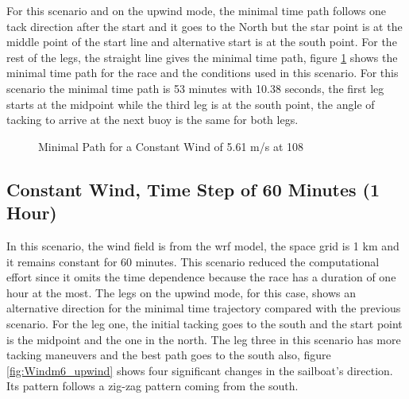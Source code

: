 For this scenario and on the upwind mode, the minimal time path follows one tack direction after the start and it goes to the North but the star point is at the middle point of the start line and alternative start is at the south point. For the rest of the legs, the straight line gives the minimal time path, figure \ref{fig:mtp_constWind} shows the minimal time path for the race and the conditions used in this scenario. For this scenario the minimal time path is 53 minutes with 10.38 seconds, the first leg starts at the midpoint while the third leg is at the south point, the angle of tacking to arrive at the next buoy is the same for both legs. \par  

\begin{figure} [hbt!]
  \centering
   \label{fig:windConst_times}
  \hfill
  \caption{Minimal Path for a Constant Wind of 5.61 m/s at 108 \degree} %
\label{fig:mtp_constWind}
\end{figure}


\subsection{Constant Wind, Time Step of 60 Minutes (1 Hour)}

In this scenario, the wind field is from the \acrshort{wrf} model, the space grid is 1 km and it remains constant for 60 minutes. This scenario reduced the computational effort since it omits the time dependence because the race has a duration of one hour at the most. The legs on the upwind mode, for this case, shows an alternative direction for the minimal time trajectory compared with the previous scenario. For the leg one, the initial tacking goes to the south and the start point is the midpoint and the one in the north. The leg three in this scenario has more tacking maneuvers and the best path goes to the south also, figure \ref{fig:Windm6_upwind} shows four significant changes in the sailboat's direction. Its pattern follows a zig-zag pattern coming from the south.  \par 

